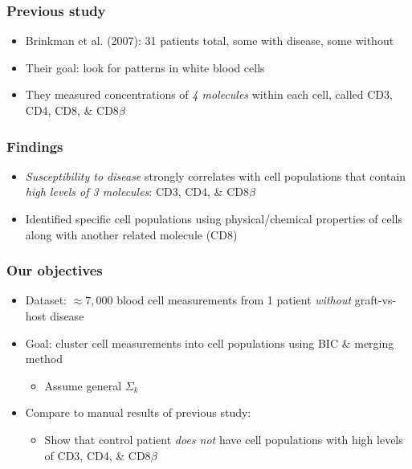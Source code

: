 \documentclass[mathserif,compress]{beamer}
\renewcommand\;{\,}
\begin{document}
\begin{frame}\frametitle{Previous study}
\begin{itemize}
\item[]
\alert{Brinkman et al. (2007):} 31 patients total, some with disease, some without
\bigskip
\item[]
\alert{Their goal:} look for patterns in white blood cells
\bigskip
\item[]
They measured concentrations of \emph{4 molecules} within each cell, called CD3, CD4, CD8, \& CD8$\beta$
\end{itemize}
\end{frame}

\begin{frame}\frametitle{Findings}
\begin{itemize}
\item
\emph{Susceptibility to disease} strongly correlates with cell populations that contain \emph{high levels of 3 molecules}: CD3, CD4, \& CD8$\beta$
\bigskip
\item
Identified specific cell populations using physical/chemical properties of cells along with another related molecule (CD8)
\end{itemize}
\end{frame}

\begin{frame}\frametitle{Our objectives}
\begin{itemize}
\item[]
\alert{Dataset:}
 $\approx 7,000$ blood cell measurements from 1 patient \emph{without} graft-vs-host disease
\bigskip
\item[]
\alert{Goal:} cluster cell measurements into cell populations using BIC \& merging method
\bigskip
\begin{itemize}
\item
Assume general $\Sigma_k$
\end{itemize}
\bigskip
\item[]
Compare to manual results of previous study:
\bigskip
\begin{itemize}
\item
Show that control patient \emph{does not} have cell populations with high levels of CD3, CD4, \& CD8$\beta$
\end{itemize}
\end{itemize}
\end{frame}
\end{document}
